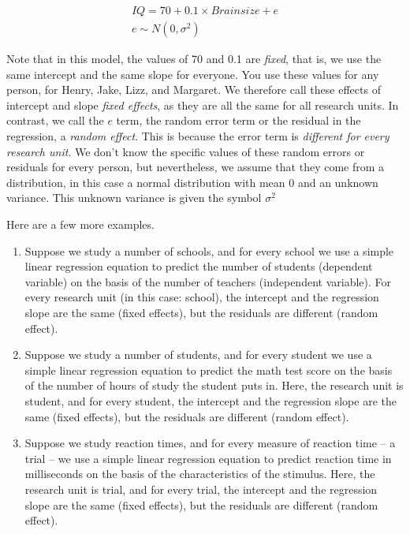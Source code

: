 \documentclass[]{report}\usepackage[]{graphicx}\usepackage[]{color}
\begin{document}
\begin{eqnarray}
IQ = 70 + 0.1 \times Brainsize + e \\
e \sim N(0, \sigma^2)
\end{eqnarray}

Note that in this model, the values of 70 and 0.1 are \textit{fixed}, that is, we use the same intercept and the same slope for everyone. You use these values for any person, for Henry, Jake, Lizz, and Margaret. We therefore call these effects of intercept and slope \textit{fixed effects}, as they are all the same for all research units. In contrast, we call the $e$ term, the random error term or the residual in the regression, a \textit{random effect}. This is because the error term is \textit{different for every research unit}. We don't know the specific values of these random errors or residuals for every person, but nevertheless, we assume that they come from a distribution, in this case a normal distribution with mean 0 and an unknown variance. This unknown variance is given the symbol $\sigma^2$ 

Here are a few more examples. 

\begin{enumerate}
\item Suppose we study a number of schools, and for every school we use a simple linear regression equation to predict the number of students (dependent variable) on the basis of the number of teachers (independent variable). For every research unit (in this case: school), the intercept and the regression slope are the same (fixed effects), but the residuals are different (random effect). 

\item Suppose we study a number of students, and for every student we use a simple linear regression equation to predict the math test score on the basis of the number of hours of study the student puts in. Here, the research unit is student, and for every student, the  intercept and the regression slope are the same (fixed effects), but the residuals are different (random effect).

\item Suppose we study reaction times, and for every measure of reaction time -- a trial -- we use a simple linear regression equation to predict reaction time in milliseconds on the basis of the characteristics of the stimulus. Here, the research unit is trial, and for every trial, the intercept and the regression slope are the same (fixed effects), but the residuals are different (random effect).
\end{enumerate}
\end{document}
